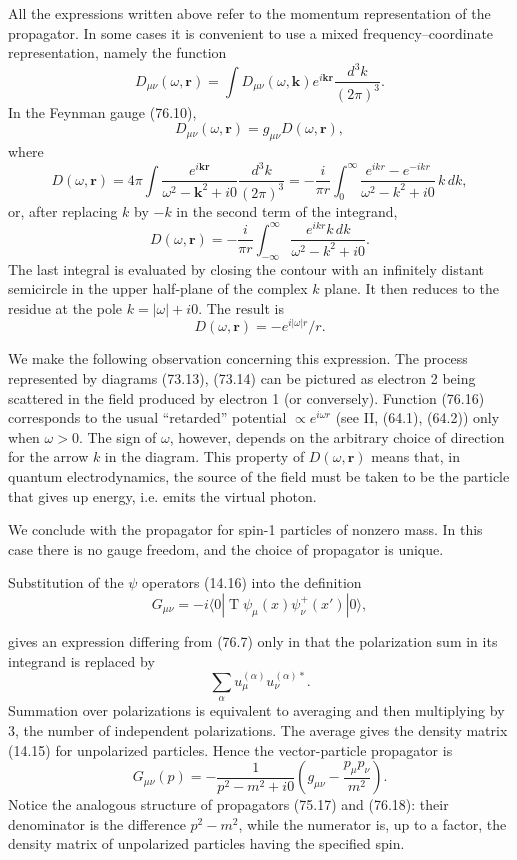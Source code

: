 All the expressions written above refer to the momentum representation of the propagator. In some cases it is convenient to use a mixed frequency--coordinate representation, namely the function
\begin{equation}
D_{\mu\nu}(\omega,\mathbf r)=\int D_{\mu\nu}(\omega,\mathbf k)e^{i\mathbf k\mathbf r}\frac{d^3k}{(2\pi)^3}.
\tag{76.15}
\end{equation}
In the Feynman gauge (76.10),
\[
D_{\mu\nu}(\omega,\mathbf r)=g_{\mu\nu}D(\omega,\mathbf r),
\]
where
\[
D(\omega,\mathbf r)=4\pi\int\frac{e^{i\mathbf k\mathbf r}}{\omega^2-\mathbf k^2+i0}\frac{d^3k}{(2\pi)^3}
=-\frac{i}{\pi r}\int_0^\infty\frac{e^{ikr}-e^{-ikr}}{\omega^2-k^2+i0}\,k\,dk,
\]
or, after replacing $k$ by $-k$ in the second term of the integrand,
\[
D(\omega,\mathbf r)=-\frac{i}{\pi r}\int_{-\infty}^{\infty}
\frac{e^{ikr}k\,dk}{\omega^2-k^2+i0}.
\]
The last integral is evaluated by closing the contour with an infinitely distant semicircle in the upper half-plane of the complex $k$ plane. It then reduces to the residue at the pole $k=|\omega|+i0$. The result is
\begin{equation}
D(\omega,\mathbf r)=-e^{i|\omega|r}/r.
\tag{76.16}
\end{equation}

We make the following observation concerning this expression. The process represented by diagrams (73.13), (73.14) can be pictured as electron 2 being scattered in the field produced by electron 1 (or conversely). Function (76.16) corresponds to the usual ``retarded'' potential $\propto e^{i\omega r}$ (see II, (64.1), (64.2)) only when $\omega>0$. The sign of $\omega$, however, depends on the arbitrary choice of direction for the arrow $k$ in the diagram. This property of $D(\omega,\mathbf r)$ means that, in quantum electrodynamics, the source of the field must be taken to be the particle that gives up energy, i.e. emits the virtual photon.

We conclude with the propagator for spin-1 particles of nonzero mass. In this case there is no gauge freedom, and the choice of propagator is unique.

Substitution of the $\psi$ operators (14.16) into the definition
\begin{equation}
G_{\mu\nu}=-i\langle 0|\operatorname{T}\psi_\mu(x)\psi_\nu^+(x')|0\rangle,
\tag{76.17}
\end{equation}

gives an expression differing from (76.7) only in that the polarization sum in its integrand is replaced by
\[
\sum_\alpha u_\mu^{(\alpha)}u_\nu^{(\alpha)*}.
\]
Summation over polarizations is equivalent to averaging and then multiplying by 3, the number of independent polarizations. The average gives the density matrix (14.15) for unpolarized particles. Hence the vector-particle propagator is
\begin{equation}
G_{\mu\nu}(p)=-\frac{1}{p^2-m^2+i0}
\left(g_{\mu\nu}-\frac{p_\mu p_\nu}{m^2}\right).
\tag{76.18}
\end{equation}
Notice the analogous structure of propagators (75.17) and (76.18): their denominator is the difference $p^2-m^2$, while the numerator is, up to a factor, the density matrix of unpolarized particles having the specified spin.
